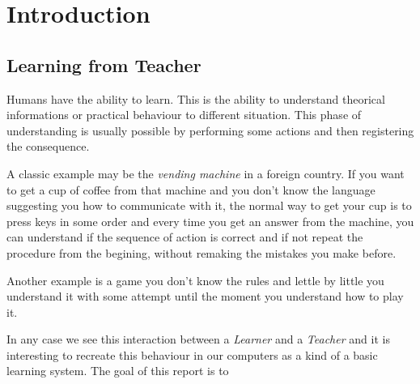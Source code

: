 \section{Introduction}

\subsection{Learning from Teacher}



Humans have the ability to learn. This is the ability to understand theorical informations or practical behaviour to different situation. This phase of understanding is usually possible by performing some actions and then registering the consequence.

A classic example may be the \textit{vending machine} in a foreign country. If you want to get a cup of coffee from that machine and you don't know the language suggesting you how to communicate with it, the normal way to get your cup is to press keys in some order and every time you get an answer from the machine, you can understand if the sequence of action is correct and if not repeat the procedure from the begining, without remaking the mistakes you make before.

Another example is a game you don't know the rules and lettle by little you understand it with some attempt until the moment you understand how to play it.

In any case we see this interaction between a \textit{Learner} and a \textit{Teacher} and it is interesting to recreate this behaviour in our computers as a kind of a basic learning system. The goal of this report is to


